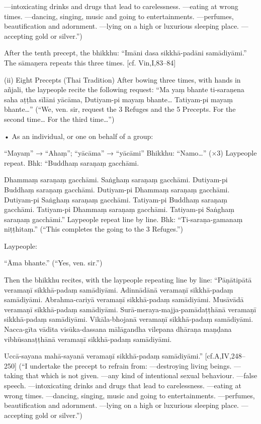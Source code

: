 —intoxicating drinks and drugs that lead to
carelessness.
—eating at wrong times.
—dancing, singing, music and going to
entertainments.
—perfumes, beautification and adornment.
—lying on a high or luxurious sleeping place.
—accepting gold or silver.”)

After the tenth precept, the bhikkhu:
“Imāni dasa sikkhā-padāni samādiyāmi.”
The sāmaṇera repeats this three times.
[cf. Vin,I,83–84]

(ii) Eight Precepts (Thai Tradition)
After bowing three times, with hands in
añjali, the laypeople recite the following
request:
“Ma yaṃ bhante ti-saraṇena saha
aṭṭha sīlāni yācāma,
Dutiyam-pi mayaṃ bhante…
Tatiyam-pi mayaṃ bhante…”
(“We, ven. sir, request the 3 Refuges and the 5
Precepts. For the second time… For the third time…”)

• As an individual, or one on behalf of a group:

“Mayaṃ” → “Ahaṃ”; “yācāma” → “yācāmi”
Bhikkhu:
“Namo…” (×3)
Laypeople repeat.
Bhk: “Buddhaṃ saraṇaṃ gacchāmi.

Dhammaṃ saraṇaṃ gacchāmi.
Saṅghaṃ saraṇaṃ gacchāmi.
Dutiyam-pi Buddhaṃ saraṇaṃ gacchāmi.
Dutiyam-pi Dhammaṃ saraṇaṃ gacchāmi.
Dutiyam-pi Saṅghaṃ saraṇaṃ gacchāmi.
Tatiyam-pi Buddhaṃ saraṇaṃ gacchāmi.
Tatiyam-pi Dhammaṃ saraṇaṃ gacchāmi.
Tatiyam-pi Saṅghaṃ saraṇaṃ gacchāmi.”
Laypeople repeat line by line.
Bhk: “Ti-saraṇa-gamanaṃ niṭṭhitaṃ.”
(“This completes the going to the 3 Refuges.”)

Laypeople:

“Āma bhante.”
(“Yes, ven. sir.”)

Then the bhikkhu recites, with the laypeople
repeating line by line:
“Pāṇātipātā veramaṇī sikkhā-padaṃ samādiyāmi.
Adinnādānā veramaṇī sikkhā-padaṃ samādiyāmi.
Abrahma-cariyā veramaṇī sikkhā-padaṃ
samādiyāmi.
Musāvādā veramaṇī sikkhā-padaṃ samādiyāmi.
Surā-meraya-majja-pamādaṭṭhānā veramaṇī
sikkhā-padaṃ samādiyāmi.
Vikāla-bhojanā veramaṇī sikkhā-padaṃ
samādiyāmi.
Nacca-gīta vādita visūka-dassana mālāgandha vilepana dhāraṇa maṇḍana
vibhūsanaṭṭhānā veramaṇī sikkhā-padaṃ
samādiyāmi.

Uccā-sayana mahā-sayanā veramaṇī
sikkhā-padaṃ samādiyāmi.”
[cf.A,IV,248–250]
(“I undertake the precept to refrain from:
—destroying living beings.
—taking that which is not given.
—any kind of intentional sexual behaviour.
—false speech.
—intoxicating drinks and drugs that lead to
carelessness.
—eating at wrong times.
—dancing, singing, music and going to
entertainments.
—perfumes, beautification and adornment.
—lying on a high or luxurious sleeping place.
—accepting gold or silver.”)

